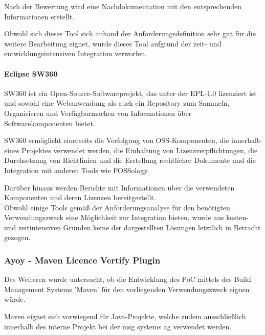 Nach der Bewertung wird eine Nachdokumentation mit den entsprechenden Informationen erstellt. 

Obwohl sich dieses Tool sich anhand der Anforderungsdefinition sehr gut für die weitere Bearbeitung eignet, wurde dieses Tool aufgrund der zeit- und entwicklungsintensiven Integration verworfen.

\paragraph{Eclipse SW360}

SW360 ist ein Open-Source-Softwareprojekt, das unter der EPL-1.0 lizenziert ist und sowohl eine Webanwendung als auch ein Repository zum Sammeln, Organisieren und Verfügbarmachen von Informationen über Softwarekomponenten bietet. \cite{the_eclipse_foundation_sw360_2018} 

SW360 ermöglicht einerseits die Verfolgung von OSS-Komponenten, die innerhalb eines Projektes verwendet werden, die Einhaltung von Lizenzverpflichtungen, die Durchsetzung von Richtlinien und die Erstellung rechtlicher Dokumente und die Integration mit anderen Tools wie FOSSology. 

Darüber hinaus werden Berichte mit Informationen über die verwendeten Komponenten und deren Lizenzen bereitgestellt.\\

Obwohl einige Tools gemäß der Anforderungsanalyse für den benötigten Verwendungszweck eine Möglichkeit zur Integration bieten, wurde aus kosten- und zeitintensiven Gründen keine der dargestellten Lösungen letztlich in Betracht gezogen.   

\subsubsection{Ayoy - Maven Licence Vertify Plugin}
Des Weiteren wurde untersucht, ob die Entwicklung des PoC mittels des Build Management Systems 'Maven' für den vorliegenden Verwendungszweck eignen würde.

Maven eignet sich vorwiegend für Java-Projekte, welche zudem ausschließlich innerhalb des interne Projekt bei der msg systems ag verwendet werden.

